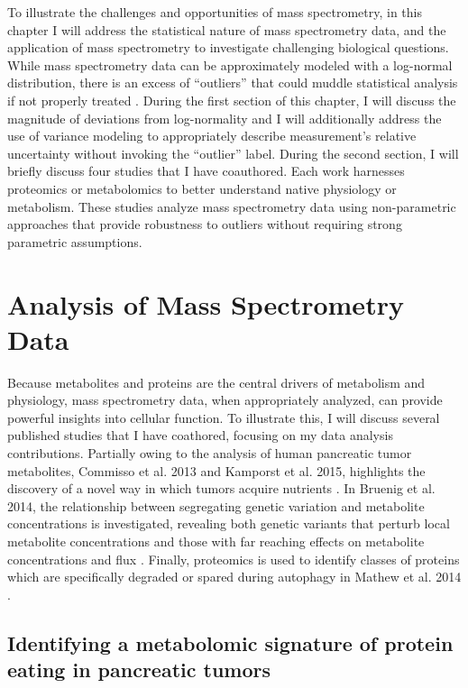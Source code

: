 To illustrate the challenges and opportunities of mass spectrometry, in this chapter I will address the statistical nature of mass spectrometry data, and the application of mass spectrometry to investigate challenging biological questions.  While mass spectrometry data can be approximately modeled with a log-normal distribution, there is an excess of ``outliers'' that could muddle statistical analysis if not properly treated \cite{Nesvizhskii:2005jp, Cox:2008ir}. During the first section of this chapter, I will discuss the magnitude of deviations from log-normality and I will additionally address the use of variance modeling to appropriately describe measurement's relative uncertainty without invoking the ``outlier'' label.  During the second section, I will briefly discuss four studies that I have coauthored. Each work harnesses proteomics or metabolomics to better understand native physiology or metabolism. These studies analyze mass spectrometry data using non-parametric approaches that provide robustness to outliers without requiring strong parametric assumptions.




\section{Analysis of Mass Spectrometry Data}

Because metabolites and proteins are the central drivers of metabolism and physiology, mass spectrometry data, when appropriately analyzed, can provide powerful insights into cellular function.  To illustrate this, I will discuss several published studies that I have coathored, focusing on my data analysis contributions. Partially owing to the analysis of human pancreatic tumor metabolites, Commisso et al. 2013 and Kamporst et al. 2015, highlights the discovery of a novel way in which tumors acquire nutrients \cite{Commisso:2013hz, Kamphorst:2015cc}.  In Bruenig et al. 2014, the relationship between segregating genetic variation and metabolite concentrations is investigated, revealing both genetic variants that perturb local metabolite concentrations and those with far reaching effects on metabolite concentrations and flux \cite{Breunig:2014bu}.  Finally, proteomics is used to identify classes of proteins which are specifically degraded or spared during autophagy in Mathew et al. 2014 \cite{Mathew:2014hz}.

\subsection{Identifying a metabolomic signature of protein eating in pancreatic tumors}

